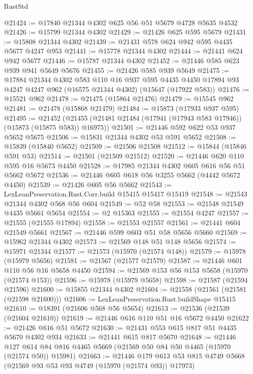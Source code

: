 \begin{lexlean}{RustStd}
\begin{coremodule}
@21424 := @17840 @21344 @4302 @625 @56 @51 @5679 @4728 @5635 @4532
@21426 := @15799 @21344 @4302
@21429 := @21426 @625 @595 @5679
@21431 := @15808 @21344 @4302
@21439 := @21431 @578 @624 @942 @595 @4435 @5677 @4247 @953
@21441 := @15778 @21344 @4302
@21444 := @21441 @624 @942 @5677
@21446 := @15787 @21344 @4302
@21452 := @21446 @585 @623 @939 @941 @5649 @5676
@21455 := @21426 @585 @939 @5649
@21475 := @17884
    @21344
    @4302
    @583
    @110
    @16
    @937
    @595
    @4435
    @4450
    @17894
    @93
    @4247
    @4247
    @962
    (@16575 @21344 @4302)
    (@15647 (@17922 @583))
@21476 := @15521 @962
@21478 := @21475 (@15864 @21476)
@21479 := @15545 @962
@21481 := @21478 (@15868 @21479)
@21484 := @15873 (@17933 @937 @595)
@21495 := @21452
    (@21455 (@21481 @21484 (@17941 (@17943 @583 @17946)) (@15873 (@15875 @583)) @16975))
@21501 := @21446 @592 @622 @53 @937 @5652 @5675
@21506 := @15831 @21344 @4302 @53 @591 @5652
@21508 := @15839 (@15840 @5652)
@21509 := @21506 @21508
@21512 := @15844 (@15846 @591 @53)
@21514 := @21501 (@21509 @21512)
@21520 := @21446 @620 @110 @595 @16 @5673 @4450
@21528 := @17985 @21344 @4302 @605 @616 @56 @51 @5662 @5672
@21536 := @21446 @605 @618 @56 @3255 @5662 (@4442 @5672 @4450)
@21539 := @21426 @605 @56 @5662
@21543 := LexLeanPreservation.Rust.Corr.build @15415 @15417 @15419
@21548 := @21543 @21344 @4302 @568 @56 @604
@21549 := @52 @58
@21553 := @21548 @21549 @4435 @5661 @5654
@21554 := @2 @15363
@21555 := @21554 @4247
@21557 := @21555 (@21555 @17894)
@21558 := @21553 @21557
@21561 := @21441 @604 @21549 @5661
@21567 := @21446 @599 @603 @51 @58 @5656 @5660
@21569 := @15962 @21344 @4302
@21573 := @21569 @148 @51 @148 @5656
@21574 := @15971 @21344
@21577 := @21573 (@15970 (@21574 @148))
@21579 := @15978 (@15979 @5656)
@21581 := @21567 (@21577 @21579)
@21587 := @21446 @601 @110 @56 @16 @5658 @4450
@21594 := @21569 @153 @56 @153 @5658 (@15970 (@21574 @153))
@21596 := @15978 (@15979 @5658)
@21598 := @21587 (@21594 @21596)
@21600 := @15855 @21344 @4302
@21604 := @21558 (@21561 (@21581 (@21598 @21600)))
@21606 := LexLeanPreservation.Rust.buildShape @15415
@21610 := @18391 (@21606 @568 @56 @5654)
@21613 := @21536 (@21539 (@21604 @21610))
@21619 := @21446 @616 @110 @51 @16 @5672 @4450
@21622 := @21426 @616 @51 @5672
@21630 := @21431 @553 @615 @817 @51 @4435 @5670 @4302 @934
@21633 := @21441 @615 @817 @5670
@21648 := @21446
    @127
    @614
    @84
    @816
    @4465
    @5669
    (@21569 @50 @84 @50 @4465 (@15970 (@21574 @50)) @15981)
@21663 := @21446
    @179
    @613
    @53
    @815
    @4749
    @5668
    (@21569 @93 @53 @93 @4749 (@15970 (@21574 @93)) @17973)

\end{coremodule}
\end{lexlean}
